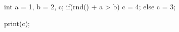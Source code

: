 \begin{minipage}[t]{2.5in}
\begin{AVerb}[numbers=left]
int a = 1, b = 2, c;
if(rnd() + a > b) 
  c = 4;
else     
  c = 3;

print(c);
\end{AVerb}
\end{minipage}
